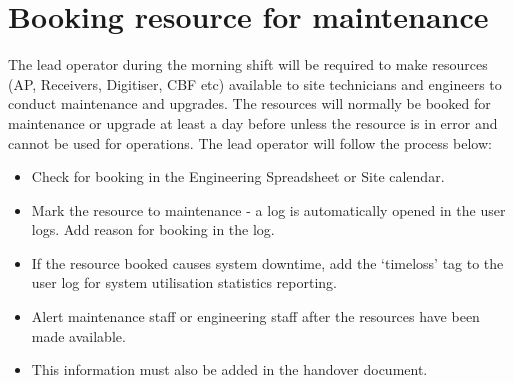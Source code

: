 \section{Booking resource for maintenance}
The lead operator during the morning shift will be required to make resources (AP, Receivers, Digitiser, CBF etc) available to site technicians and engineers to conduct maintenance and upgrades. The resources will normally be booked for maintenance or upgrade at least a day before unless the resource is in error and cannot be used for operations. The lead operator will follow the process below:
\begin{itemize}
\item{} Check for booking in the Engineering Spreadsheet or Site calendar.
\item{} Mark the resource to maintenance - a log is automatically opened in the user logs. Add reason for booking in the log.
\item{} If the resource booked causes system downtime, add the ‘timeloss’ tag to the user log for system utilisation statistics reporting.
\item{} Alert maintenance staff or engineering staff after the resources have been made available. 
\item{} This information must also be added in the handover document. 
\end{itemize}
